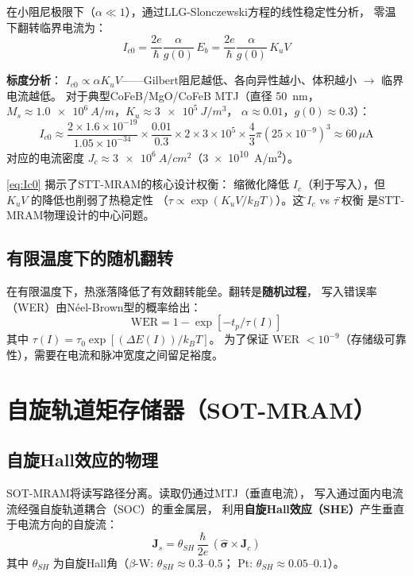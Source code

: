 \documentclass[11pt,a4paper,twoside]{article}
\theoremstyle{definition}\newtheorem{definition}{定义}[section]
\theoremstyle{plain}\newtheorem{theorem}{定理}[section]
\theoremstyle{remark}\newtheorem{remark}{注解}[section]
\begin{document}
在小阻尼极限下（$\alpha \ll 1$），通过LLG-Slonczewski方程的线性稳定性分析，
零温下翻转临界电流为：
\begin{equation}\label{eq:Ic0}
  \boxed{ I_{c0} = \frac{2e}{\hbar} \frac{\alpha}{g(0)}\, E_b
  = \frac{2e}{\hbar} \frac{\alpha}{g(0)}\, K_u V }
\end{equation}

\textbf{标度分析}：
$I_{c0} \propto \alpha K_u V$——Gilbert阻尼越低、各向异性越小、体积越小
$\to$ 临界电流越低。
对于典型CoFeB/MgO/CoFeB MTJ（直径 \SI{50}{nm}，
$M_s \approx \SI{1.0e6}{A/m}$，$K_u \approx \SI{3e5}{J/m^3}$，
$\alpha \approx 0.01$，$g(0) \approx 0.3$）：
\begin{equation}
  I_{c0} \approx \frac{2 \times 1.6\times10^{-19}}{1.05\times10^{-34}}
  \times \frac{0.01}{0.3}
  \times 2 \times 3\times10^5 \times \frac{4}{3}\pi (25\times10^{-9})^3
  \approx 60\,\mu\mathrm{A}
\end{equation}
对应的电流密度 $J_c \approx \SI{3e6}{A/cm^2}$（\SI{3e10}{A/m^2}）。

\cref{eq:Ic0} 揭示了STT-MRAM的核心设计权衡：
缩微化降低 $I_c$（利于写入），但 $K_u V$ 的降低也削弱了热稳定性
（$\tau \propto \exp(K_u V / k_B T)$）。这个\"$I_c$ vs $\tau$\" 的权衡
是STT-MRAM物理设计的中心问题。

\subsection{有限温度下的随机翻转}

在有限温度下，热涨落降低了有效翻转能垒。翻转是\textbf{随机过程}，
写入错误率（WER）由N\'{e}el-Brown型的概率给出：
\begin{equation}
  \text{WER} = 1 - \exp\!\left[ -t_p / \tau(I) \right]
\end{equation}
其中 $\tau(I) = \tau_0 \exp[(\Delta E(I)) / k_B T]$。
为了保证 WER $< 10^{-9}$（存储级可靠性），需要在电流和脉冲宽度之间留足裕度。

\section{自旋轨道矩存储器（SOT-MRAM）}
\label{sec:sot}

\subsection{自旋Hall效应的物理}

SOT-MRAM将读写路径分离。读取仍通过MTJ（垂直电流），
写入通过面内电流流经强自旋轨道耦合（SOC）的重金属层，
利用\textbf{自旋Hall效应（SHE）}产生垂直于电流方向的自旋流：
\begin{equation}\label{eq:she}
  \mathbf{J}_s = \theta_{SH}\, \frac{\hbar}{2e}\,
                (\hat{\boldsymbol{\sigma}} \times \mathbf{J}_c)
\end{equation}
其中 $\theta_{SH}$ 为自旋Hall角（$\beta$-W: $\theta_{SH} \approx 0.3$--$0.5$；
Pt: $\theta_{SH} \approx 0.05$--$0.1$）。
\end{document}
